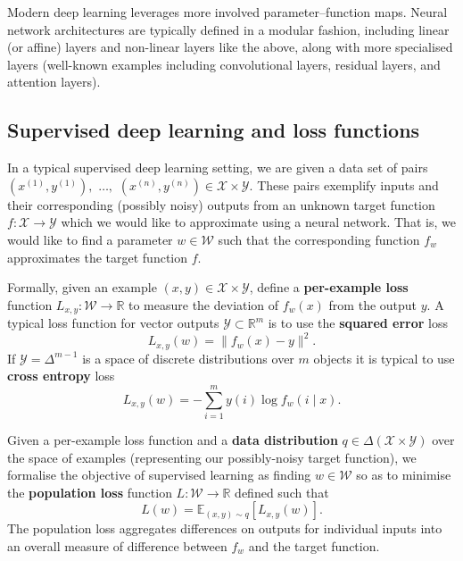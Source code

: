 \documentclass[11pt]{article}
\newcommand{\R}{\mathbb{R}}
\newcommand{\E}{\mathbb{E}}
\newcommand{\X}{\mathcal{X}}
\newcommand{\Y}{\mathcal{Y}}
\newcommand{\W}{\mathcal{W}}
\begin{document}
Modern deep learning leverages more involved parameter--function maps. Neural
network architectures are typically defined in a modular fashion, including
linear (or affine) layers and non-linear layers like the above, along with more
specialised layers (well-known examples including convolutional layers,
residual layers, and attention layers).

\subsection{Supervised deep learning and loss functions}

In a typical supervised deep learning setting, we are given a data set of pairs
    $(x^{(1)}, y^{(1)}),$ $\ldots,$ $(x^{(n)}, y^{(n)}) \in \X \times \Y$.
These pairs exemplify inputs and their corresponding (possibly noisy) outputs
from an unknown target function
    $f : \X \to \Y$
which we would like to approximate using a neural network. That is, we would
like to find a parameter $w \in \W$ such that the corresponding function $f_w$
approximates the target function $f$.

Formally, given an example $(x, y) \in \X \times \Y$, define a
\textbf{per-example loss} function
    $L_{x,y} : \W \to \R$
to measure the deviation of $f_w(x)$ from the output $y$. A typical loss
function for vector outputs $\Y \subset \R^m$ is to use the \textbf{squared
error} loss
\begin{equation}
    \label{eq:square-loss}
    L_{x,y}(w) = \|f_w(x) - y\|^2.
\end{equation}
If $\Y = \Delta^{m-1}$ is a space of discrete distributions over $m$ objects it
is typical to use \textbf{cross entropy} loss
\begin{equation}
    \label{eq:cross-entropy}
    L_{x,y}(w) = - \sum_{i=1}^m y(i) \log f_w(i \mid x).
\end{equation}

Given a per-example loss function and a \textbf{data distribution}
    $q \in \Delta(\X\times\Y)$
over the space of examples (representing our possibly-noisy target function),
we formalise the objective of supervised learning as finding $w \in \W$ so as
to minimise the \textbf{population loss} function
    $L : \W \to \R$
defined such that
\begin{equation}
    L(w) = \E_{(x,y) \sim q}[L_{x,y}(w)].
\end{equation}
The population loss aggregates differences on outputs for individual inputs
into an overall measure of difference between $f_w$ and the target function.
\end{document}
